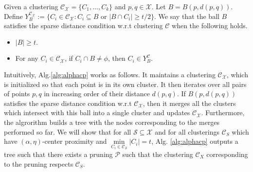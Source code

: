 \documentclass[11pt]{article}
\newcommand{\mc}{\mathcal}
\begin{document}
\begin{definition}
	 Given a clustering $\mc C_{\mc X}=\{C_1,\ldots,C_k\}$ and $p, q \in \mc X$. Let $B = B(p, d(p, q))$. Define $Y_B^{\mc C_{\mc X}} := \{C_i \in \mc C_{\mc X} : C_i \subseteq B \text{ or } |B \cap C_i| \ge t/2\}$. 
We say that the ball $B$ satisfies the sparse distance condition w.r.t clustering $\mc C$ when the following holds.
\begin{itemize}[noitemsep, leftmargin=*]
\item $|B| \ge t$.
\item For any $C_i \in \mc C_{\mc X}$, if $C_i \cap B \neq \phi$, then $C_i \in Y_B^{\mc C}$.
\end{itemize}
\end{definition}

Intuitively, Alg.\ref{alg:alphacp} works as follows. It maintains a clustering $\mc C_{\mc X}$, which is initialized so that  each point is in its own cluster. It then iterates over all pairs of points $p, q$ in increasing order of their distance $d(p, q)$. If $B(p, d(p,q))$ satisfies the sparse distance condition w.r.t $\mc C_{\mc X}$, then it merges all the clusters which intersect with this ball into a single cluster and updates $\mc C_{\mc X}$. Furthermore, the algrorithm builds a tree with the nodes corresponding to the merges performed so far. We will show that for all $\mc S \subseteq \mc X$ and for all clusterings $\mc C_S$ which have $(\alpha, \eta)$-center proximity and $\min\limits_{C_i \in {\mc C}_{\mc S}} |C_i| = t$, Alg. \ref{alg:alphacp} outputs a tree such that there exists a pruning $\mc P$ such that the clustering $\mc C_X$ corresponding to the pruning respects $\mc C_S$. %
\end{document}

